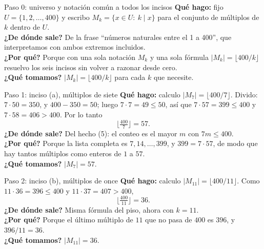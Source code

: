 \documentclass[11pt]{article}
\begin{document}
\begin{sol}

\begin{paso}{Paso 0: universo y notaci\'on com\'un a todos los incisos}
\textbf{Qu\'e hago:} fijo $U=\{1,2,\dots,400\}$ y escribo $M_k=\{x\in U:\ k\mid x\}$ para el conjunto de m\'ultiplos de $k$ dentro de $U$.\\
\textbf{¿De d\'onde sale?} De la frase ``n\'umeros naturales entre el 1 a 400'', que interpretamos con ambos extremos incluidos.\\
\textbf{¿Por qu\'e?} Porque con una sola notaci\'on $M_k$ y una sola f\'ormula $|M_k|=\lfloor 400/k\rfloor$ resuelvo los seis incisos sin volver a razonar desde cero.\\
\textbf{¿Qu\'e tomamos?} $|M_k| = \big\lfloor 400/k \big\rfloor$ para cada $k$ que necesite.
\end{paso}

\begin{paso}{Paso 1: inciso (a), m\'ultiplos de siete}
\textbf{Qu\'e hago:} calculo $|M_7| = \big\lfloor 400/7 \big\rfloor$. Divido: $7\cdot 50 = 350$, y $400-350 = 50$; luego $7\cdot 7 = 49 \le 50$, as\'i que $7\cdot 57 = 399 \le 400$ y $7\cdot 58 = 406 > 400$. Por lo tanto
\[
\Big\lfloor \tfrac{400}{7}\Big\rfloor = 57.
\]
\textbf{¿De d\'onde sale?} Del hecho (5): el conteo es el mayor $m$ con $7m\le 400$.\\
\textbf{¿Por qu\'e?} Porque la lista completa es $7,14,\dots,399$, y $399 = 7\cdot 57$, de modo que hay tantos m\'ultiplos como enteros de $1$ a $57$.\\
\textbf{¿Qu\'e tomamos?} $|M_7| = 57$.
\end{paso}

\begin{paso}{Paso 2: inciso (b), m\'ultiplos de once}
\textbf{Qu\'e hago:} calculo $|M_{11}| = \big\lfloor 400/11 \big\rfloor$. Como $11\cdot 36 = 396 \le 400$ y $11\cdot 37 = 407 > 400$,
\[
\Big\lfloor \tfrac{400}{11}\Big\rfloor = 36.
\]
\textbf{¿De d\'onde sale?} Misma f\'ormula del piso, ahora con $k=11$.\\
\textbf{¿Por qu\'e?} Porque el \'ultimo m\'ultiplo de $11$ que no pasa de $400$ es $396$, y $396/11=36$.\\
\textbf{¿Qu\'e tomamos?} $|M_{11}| = 36$.
\end{paso}


\end{sol}
\end{document}
